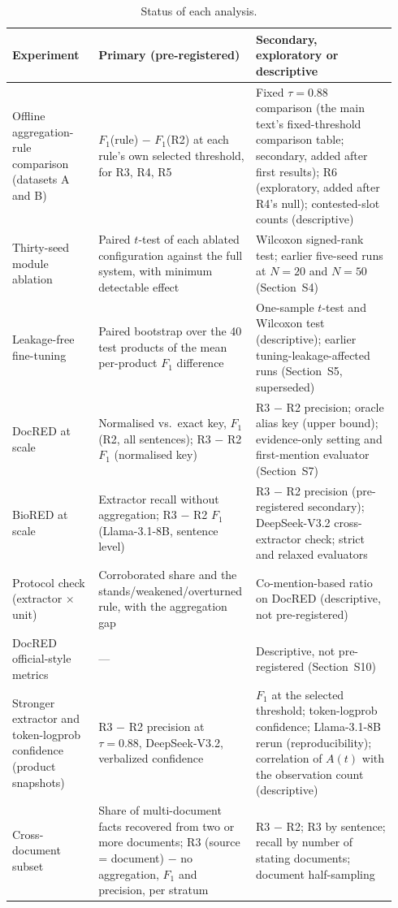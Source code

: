\documentclass[11pt]{article}
\begin{document}
\begin{table}[htbp]
\centering
\caption{Status of each analysis.}
\label{tab:s12-status}
\small
\begin{tabular}{@{}p{0.22\linewidth}p{0.36\linewidth}p{0.36\linewidth}@{}}
\toprule
Experiment & Primary (pre-registered) & Secondary, exploratory or descriptive \\
\midrule
Offline aggregation-rule comparison (datasets A and B) & $F_1$(rule) $-$ $F_1$(R2) at each rule's own selected threshold, for R3, R4, R5 & Fixed $\tau=0.88$ comparison (the main text's fixed-threshold comparison table; secondary, added after first results); R6 (exploratory, added after R4's null); contested-slot counts (descriptive) \\
Thirty-seed module ablation & Paired $t$-test of each ablated configuration against the full system, with minimum detectable effect & Wilcoxon signed-rank test; earlier five-seed runs at $N=20$ and $N=50$ (Section~S4) \\
Leakage-free fine-tuning & Paired bootstrap over the 40 test products of the mean per-product $F_1$ difference & One-sample $t$-test and Wilcoxon test (descriptive); earlier tuning-leakage-affected runs (Section~S5, superseded) \\
DocRED at scale & Normalised vs.\ exact key, $F_1$ (R2, all sentences); R3 $-$ R2 $F_1$ (normalised key) & R3 $-$ R2 precision; oracle alias key (upper bound); evidence-only setting and first-mention evaluator (Section~S7) \\
BioRED at scale & Extractor recall without aggregation; R3 $-$ R2 $F_1$ (Llama-3.1-8B, sentence level) & R3 $-$ R2 precision (pre-registered secondary); DeepSeek-V3.2 cross-extractor check; strict and relaxed evaluators \\
Protocol check (extractor $\times$ unit) & Corroborated share and the stands/weakened/overturned rule, with the aggregation gap & Co-mention-based ratio on DocRED (descriptive, not pre-registered) \\
DocRED official-style metrics & --- & Descriptive, not pre-registered (Section~S10) \\
Stronger extractor and token-logprob confidence (product snapshots) & R3 $-$ R2 precision at $\tau=0.88$, DeepSeek-V3.2, verbalized confidence & $F_1$ at the selected threshold; token-logprob confidence; Llama-3.1-8B rerun (reproducibility); correlation of $A(t)$ with the observation count (descriptive) \\
Cross-document subset & Share of multi-document facts recovered from two or more documents; R3 (source = document) $-$ no aggregation, $F_1$ and precision, per stratum & R3 $-$ R2; R3 by sentence; recall by number of stating documents; document half-sampling \\

\end{tabular}
\end{table}
\end{document}
